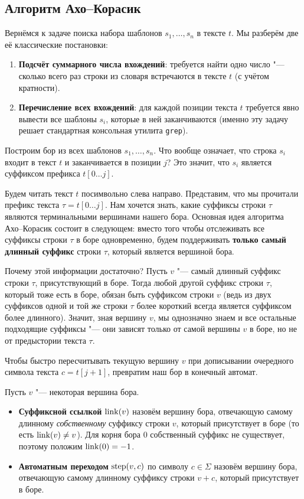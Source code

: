\subsection{Алгоритм Ахо--Корасик}

Вернёмся к задаче поиска набора шаблонов $s_1, \dots, s_n$ в тексте $t$. Мы разберём две её классические постановки:
\begin{enumerate}
    \item \textbf{Подсчёт суммарного числа вхождений}: требуется найти одно число "--- сколько всего раз строки из словаря встречаются в тексте $t$ (с учётом кратности).
    \item \textbf{Перечисление всех вхождений}: для каждой позиции текста $t$ требуется явно вывести все шаблоны $s_i$, которые в ней заканчиваются (именно эту задачу решает стандартная консольная утилита \texttt{grep}).
\end{enumerate}

Построим бор из всех шаблонов $s_1, \dots, s_n$. Что вообще означает, что строка $s_i$ входит в текст $t$ и заканчивается в позиции $j$? Это значит, что $s_i$ является суффиксом префикса $t[0 \dots j]$.

Будем читать текст $t$ посимвольно слева направо. Представим, что мы прочитали префикс текста $\tau = t[0 \dots j]$. Нам хочется знать, какие суффиксы строки $\tau$ являются терминальными вершинами нашего бора. Основная идея алгоритма Ахо--Корасик состоит в следующем: вместо того чтобы отслеживать все суффиксы строки $\tau$ в боре одновременно, будем поддерживать \textbf{только самый длинный суффикс} строки $\tau$, который является вершиной бора.

Почему этой информации достаточно? Пусть $v$ "--- самый длинный суффикс строки $\tau$, присутствующий в боре. Тогда любой другой суффикс строки $\tau$, который тоже есть в боре, обязан быть суффиксом строки $v$ (ведь из двух суффиксов одной и той же строки $\tau$ более короткий всегда является суффиксом более длинного). Значит, зная вершину $v$, мы однозначно знаем и все остальные подходящие суффиксы "--- они зависят только от самой вершины $v$ в боре, но не от предыстории текста $\tau$.

Чтобы быстро пересчитывать текущую вершину $v$ при дописывании очередного символа текста $c = t[j+1]$, превратим наш бор в конечный автомат.

\begin{definition}
    Пусть $v$ "--- некоторая вершина бора.
    \begin{itemize}
        \item \textbf{Суффиксной ссылкой} $\operatorname{link}(v)$ назовём вершину бора, отвечающую самому длинному \emph{собственному} суффиксу строки $v$, который присутствует в боре (то есть $\operatorname{link}(v) \ne v$). Для корня бора $0$ собственный суффикс не существует, поэтому положим $\operatorname{link}(0) = -1$.
        \item \textbf{Автоматным переходом} $\operatorname{step}(v, c)$ по символу $c \in \Sigma$ назовём вершину бора, отвечающую самому длинному суффиксу строки $v + c$, который присутствует в боре.
    \end{itemize}
\end{definition}


